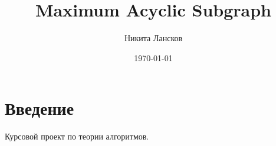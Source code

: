 \documentclass[a4paper,12pt]{article}
\author{Никита Лансков}
\title{Maximum Acyclic Subgraph}
\date{\today}
\begin{document}

\maketitle

\tableofcontents

\section*{Введение}

Курсовой проект по теории алгоритмов.














\end{document}
